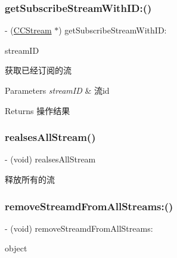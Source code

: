 \subsubsection{\texorpdfstring{get\+Subscribe\+Stream\+With\+I\+D\+:()}{getSubscribeStreamWithID:()}}
{\footnotesize\ttfamily -\/ (\hyperlink{interface_c_c_stream}{C\+C\+Stream} $\ast$) get\+Subscribe\+Stream\+With\+I\+D\+: \begin{DoxyParamCaption}\item[{(N\+S\+String $\ast$)}]{stream\+ID }\end{DoxyParamCaption}}

获取已经订阅的流 
\begin{DoxyParams}{Parameters}
{\em stream\+ID} & 流id \\
\hline
\end{DoxyParams}
\begin{DoxyReturn}{Returns}
操作结果 
\end{DoxyReturn}
\mbox{\label{interface_c_c_speaker_a6753ddeafdb6b5454b96f19bc820dc4b}} 
\subsubsection{\texorpdfstring{realses\+All\+Stream()}{realsesAllStream()}}
{\footnotesize\ttfamily -\/ (void) realses\+All\+Stream \begin{DoxyParamCaption}{ }\end{DoxyParamCaption}}

释放所有的流 \mbox{\label{interface_c_c_speaker_a0ca8c1d569368f57990783e0fc8f4c4f}} 
\subsubsection{\texorpdfstring{remove\+Streamd\+From\+All\+Streams\+:()}{removeStreamdFromAllStreams:()}}
{\footnotesize\ttfamily -\/ (void) remove\+Streamd\+From\+All\+Streams\+: \begin{DoxyParamCaption}\item[{(\hyperlink{interface_c_c_stream}{C\+C\+Stream} $\ast$)}]{object }\end{DoxyParamCaption}}

